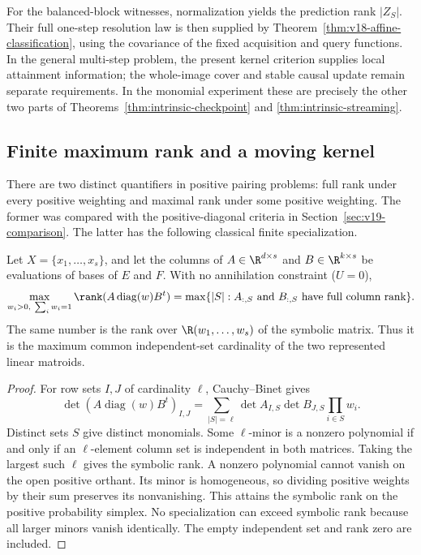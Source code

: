 For the balanced-block witnesses, normalization yields the prediction
rank $|Z_S|$. Their full one-step resolution law is then supplied by
Theorem~\ref{thm:v18-affine-classification}, using the covariance of the
fixed acquisition and query functions. In the general multi-step problem,
the present kernel criterion supplies local attainment information; the
whole-image cover and stable causal update remain separate requirements.
In the monomial experiment these are precisely the other two parts of
Theorems~\ref{thm:intrinsic-checkpoint} and
\ref{thm:intrinsic-streaming}.


\subsection{Finite maximum rank and a moving kernel}
\label{sec:finite-pairing-comparison}
There are two distinct quantifiers in positive pairing problems: full
rank under every positive weighting and maximal rank under some positive
weighting. The former was compared with the positive-diagonal criteria
in Section~\ref{sec:v19-comparison}. The latter has the following
classical finite specialization.

\begin{proposition}
\label{prop:finite-matroid-rank}
Let $X=\{x_1,\ldots,x_s\}$, and let the columns of
$A\in\R^{d\times s}$ and $B\in\R^{k\times s}$ be evaluations of
bases of $E$ and $F$. With no annihilation constraint ($U=0$),
\begin{equation}\label{eq:finite-matroid-rank}
 \max_{w_i>0,\ \sum_iw_i=1}\rank(A\operatorname{diag}(w)B^t)
 =\max\{|S|: A_{:,S}\text{ and }B_{:,S}\text{ have full column rank}\}.
\end{equation}
The same number is the rank over $\R(w_1,\ldots,w_s)$ of the symbolic
matrix. Thus it is the maximum common independent-set cardinality of
the two represented linear matroids.
\end{proposition}
\begin{proof}
For row sets $I,J$ of cardinality $\ell$, Cauchy--Binet gives
\[
 \det(A\operatorname{diag}(w)B^t)_{I,J}
 =\sum_{|S|=\ell}\det A_{I,S}\det B_{J,S}\prod_{i\in S}w_i.
\]
Distinct sets $S$ give distinct monomials. Some $\ell$-minor is a
nonzero polynomial if and only if an $\ell$-element column set is
independent in both matrices. Taking the largest such $\ell$ gives
the symbolic rank. A nonzero polynomial cannot vanish on the open
positive orthant. Its minor is homogeneous, so dividing positive
weights by their sum preserves its nonvanishing. This attains the
symbolic rank on the positive probability simplex. No specialization
can exceed symbolic rank because all larger minors vanish identically.
The empty independent set and rank zero are included.
\end{proof}

